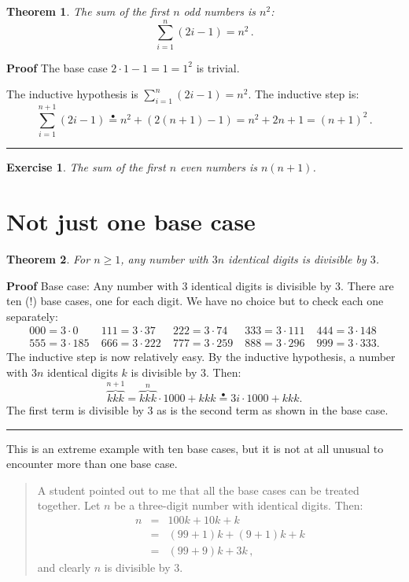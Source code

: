 \documentclass[11pt,a4paper]{report}
\newcommand*{\ih}{\stackrel{\bullet}{=}}
\newcommand*{\qed}{\hfill\rule{1ex}{1.5ex}}
\newcommand*{\qedd}[1]{\vspace*{-#1ex}\qed}
\newtheorem{theorem}{Theorem}
\newtheorem{exercise}{Exercise}
\begin{document}
\begin{theorem}
The sum of the first $n$ odd numbers is $n^2$:
\[
\sum_{i=1}^n (2i-1) = n^2\,.
\]
\end{theorem}

\textbf{Proof} The base case $2\cdot 1-1=1=1^2$ 	is trivial.

The inductive hypothesis is $\sum_{i=1}^n (2i-1) = n^2$. The inductive step is:
\[
\sum_{i=1}^{n+1} (2i-1) \ih{} n^2 + (2(n+1)-1) = n^2 + 2n + 1 = (n+1)^2\,.
\]

\qedd{5}

\begin{exercise}
The sum of the first $n$ even numbers is $n(n+1)$.
\end{exercise}

\section{Not just one base case}

\begin{theorem}\label{th.three}
For $n\geq 1$, any number with $3n$ identical digits is divisible by $3$.
\end{theorem}

\textbf{Proof} Base case: Any number with $3$ identical digits is divisible by $3$. There are ten (!) base cases, one for each digit. We have no choice but to check each one separately:
\[
\begin{array}{lllll}
000=3\cdot 0 & \;111 = 3\cdot 37 & \;222 = 3\cdot 74 &
\;333=3\cdot 111 & \;444=3\cdot 148\\
555=3\cdot 185 & \;666=3\cdot 222 & \;777=3\cdot 259 &
\;888=3\cdot 296 & \;999=3\cdot 333.
\end{array}
\]
The inductive step is now relatively easy. By the inductive hypothesis, a number with $3n$ identical digits $k$ is divisible by $3$. Then:
\[
\overbrace{kkk}^{n+1} = \overbrace{kkk}^{n}\cdot 1000 + kkk \ih{}
3i\cdot 1000 + kkk.
\]
The first term is divisible by $3$ as is the second term as shown in the base case.\qed

This is an extreme example with ten base cases, but it is not at all unusual to encounter more than one base case.

\begin{quote}
A student pointed out to me that all the base cases can be treated together. Let $n$ be a three-digit number with identical digits. Then:
\begin{eqnarray*}
n &=& 100k + 10k +k\\
&=& (99+1)k + (9+1)k + k\\
&=& (99+9)k + 3k\,,
\end{eqnarray*}
and clearly $n$ is divisible by $3$.
\end{quote}
\end{document}
